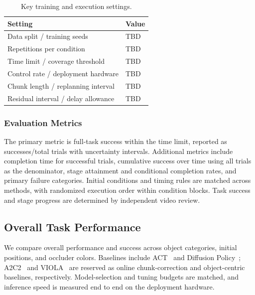 \begin{table}[!tb]
\caption{Key training and execution settings.}
\label{tab:protocol}
\centering\small
\begin{tabular}{p{}p{}}
\toprule
Setting & Value\\
\midrule
Data split / training seeds & TBD\\
Repetitions per condition & TBD\\
Time limit / coverage threshold & TBD\\
Control rate / deployment hardware & TBD\\
Chunk length / replanning interval & TBD\\
Residual interval / delay allowance & TBD\\
\bottomrule
\end{tabular}
\end{table}

\subsubsection{Evaluation Metrics}
The primary metric is full-task success within the time limit, reported as successes/total trials with uncertainty intervals.
Additional metrics include completion time for successful trials, cumulative success over time using all trials as the denominator, stage attainment and conditional completion rates, and primary failure categories.
Initial conditions and timing rules are matched across methods, with randomized execution order within condition blocks.
Task success and stage progress are determined by independent video review.

\subsection{Overall Task Performance}
\label{sec:overallperformance}
We compare overall performance and success across object categories, initial positions, and occluder colors.
Baselines include ACT~\cite{zhao2023act} and Diffusion Policy~\cite{chi2023diffusion};
A2C2~\cite{a2c2} and VIOLA~\cite{zhu2023viola} are reserved as online chunk-correction and object-centric baselines, respectively.
Model-selection and tuning budgets are matched, and inference speed is measured end to end on the deployment hardware.

